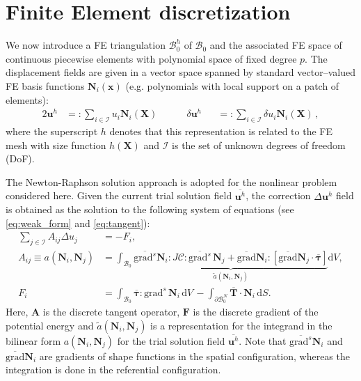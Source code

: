\documentclass[AMA,STIX1COL]{WileyNJD-v2}
\newcommand*{\gz}[1]{\boldsymbol{#1}}
\newcommand*{\grad}{\mathrm{grad}}
\renewcommand*{\d}{\mathrm{d}}
\newcommand*{\mcl}[1]{\mathcal{#1}}
\begin{document}
\section{Finite Element discretization}
\label{sec:fe}

We now introduce a FE triangulation $\mathcal{B}^h_0$ of $\mcl B_0$ and
the associated FE space of continuous piecewise elements with polynomial space of fixed degree $p$. %
The displacement fields are given in
a vector space spanned by standard vector--valued FE basis functions $\gz N_i(\gz x)$ (e.g. polynomials with local support on a patch of elements):
\begin{alignat}{2}
       \gz u^h &=:  \sum_{i \in \mcl I} u_i \gz N_i (\gz X) \quad \quad \quad
\delta \gz u^h &&=: \sum_{i \in \mcl I} \delta u_i \gz N_i (\gz X) \,,
\end{alignat}
where the superscript $h$ denotes that this representation is related to the FE mesh with size function $h(\gz X)$ and $\mcl I$ is the set of unknown degrees of freedom (DoF).

The Newton-Raphson solution approach is adopted for the nonlinear problem considered here.
Given the current trial solution field $\overline{\gz u^h}$, the correction $\Delta \gz u^h$ field is obtained as the solution to the following system of equations (see \eqref{eq:weak_form} and \eqref{eq:tangent}):
\begin{align}
  \sum_{j \in \mcl I} A_{ij} \Delta u_j &= - F_i , \label{eq:linear_system} \\
  A_{ij} \equiv a(\gz N_i, \gz N_j) &=
  \int_{\mcl B_0}
  \underbrace{
  \overline{\grad^s} \gz N_i : J \boldsymbol{\mathcal{C}} : \overline{\grad^s} \, \gz N_j
  +
  \overline{\grad}\gz N_i :
  \left[
  \overline{\grad} \gz N_j \cdot
  \overline{\gz \tau}
  \right]
  }_{\displaystyle \tilde{a}(\gz N_i, \gz N_j)}
  \d V ,
  \label{eq:algebraic_tangent}
  \\
  F_i &=
  \int_{\mcl B_0} \overline{\gz \tau} : \grad^{s} \, \gz N_i \, \d V \,
  -
  \int_{\partial \mcl B_0^N} \overline{\gz T} \cdot \gz N_i \, \d S.
\end{align}
Here, $\gz A$ is the discrete tangent operator, $\gz F$ is the discrete gradient of the potential energy
and $\tilde{a}(\gz N_i, \gz N_j)$ is a representation for the integrand in the bilinear form $a(\gz N_i, \gz N_j)$ for the trial solution field $\overline{\gz u^h}$.
Note that $\overline{\grad^s} \gz N_i$ and $\overline{\grad} \gz N_i$ are gradients of shape functions in the spatial configuration, whereas the integration is done in the referential configuration.
\end{document}
